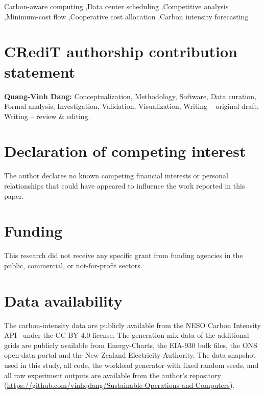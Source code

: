 \documentclass[preprint,12pt]{elsarticle}
\begin{document}
\begin{frontmatter}
\begin{keyword}
Carbon-aware computing \sep Data center scheduling \sep Competitive analysis \sep Minimum-cost flow \sep Cooperative cost allocation \sep Carbon intensity forecasting
\end{keyword}

\end{frontmatter}

\linenumbers







\section*{CRediT authorship contribution statement}
\textbf{Quang-Vinh Dang:} Conceptualization, Methodology, Software, Data curation, Formal analysis, Investigation, Validation, Visualization, Writing -- original draft, Writing -- review \& editing.

\section*{Declaration of competing interest}
The author declares no known competing financial interests or personal relationships that could have appeared to influence the work reported in this paper.

\section*{Funding}
This research did not receive any specific grant from funding agencies in the public, commercial, or not-for-profit sectors.

\section*{Data availability}
The carbon-intensity data are publicly available from the NESO Carbon Intensity API~\cite{nesoapi} under the CC BY 4.0 license. The generation-mix data of the additional grids are publicly available from Energy-Charts, the EIA-930 bulk files, the ONS open-data portal and the New Zealand Electricity Authority. The data snapshot used in this study, all code, the workload generator with fixed random seeds, and all raw experiment outputs are available from the author's repository (\url{https://github.com/vinhqdang/Sustainable-Operations-and-Computers}).

\appendix
\setcounter{figure}{0}\setcounter{table}{0}
\makeatletter{}\makeatother
\renewcommand{\thefigure}{\Alph{section}.\arabic{figure}}
\renewcommand{\thetable}{\Alph{section}.\arabic{table}}







\end{document}
